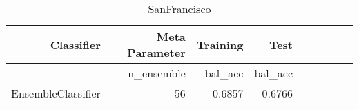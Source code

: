 
\begin{table}[H]
    \caption{SanFrancisco}
    \centering
    \begin{tabular}{|r|r|r|r|r|r|r|r|r|}
        \hline
        Classifier &Meta Parameter
        &Training
        &Test\\
        \hline
        &n\_ensemble
        &bal\_acc
        &bal\_acc\\
        \hline
        EnsembleClassifier &56 &0.6857
        &0.6766\\
        \hline
    \end{tabular}
\end{table}
